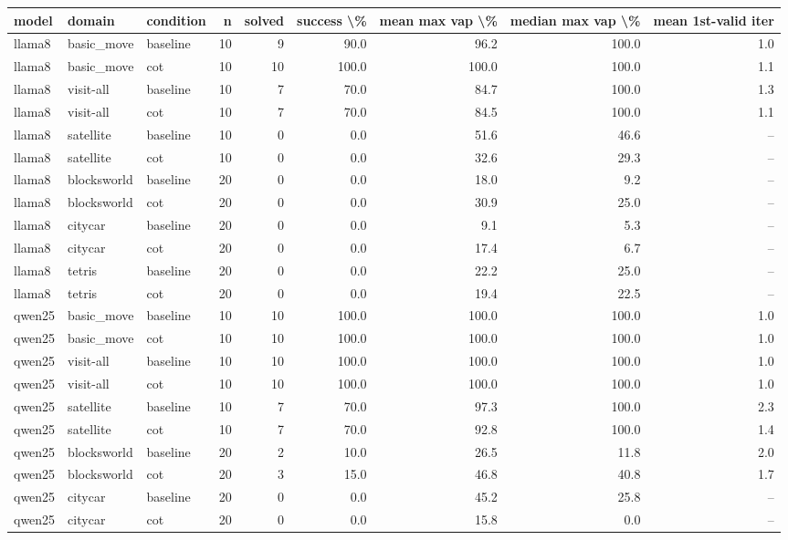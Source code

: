 \begin{tabular}{lllrrrrrr}
\toprule
model & domain & condition & n & solved & success \textbackslash \% & mean max vap \textbackslash \% & median max vap \textbackslash \% & mean 1st-valid iter \\
\midrule
llama8 & basic\_move & baseline & 10 & 9 & 90.0 & 96.2 & 100.0 & 1.0 \\
llama8 & basic\_move & cot & 10 & 10 & 100.0 & 100.0 & 100.0 & 1.1 \\
llama8 & visit-all & baseline & 10 & 7 & 70.0 & 84.7 & 100.0 & 1.3 \\
llama8 & visit-all & cot & 10 & 7 & 70.0 & 84.5 & 100.0 & 1.1 \\
llama8 & satellite & baseline & 10 & 0 & 0.0 & 51.6 & 46.6 & -- \\
llama8 & satellite & cot & 10 & 0 & 0.0 & 32.6 & 29.3 & -- \\
llama8 & blocksworld & baseline & 20 & 0 & 0.0 & 18.0 & 9.2 & -- \\
llama8 & blocksworld & cot & 20 & 0 & 0.0 & 30.9 & 25.0 & -- \\
llama8 & citycar & baseline & 20 & 0 & 0.0 & 9.1 & 5.3 & -- \\
llama8 & citycar & cot & 20 & 0 & 0.0 & 17.4 & 6.7 & -- \\
llama8 & tetris & baseline & 20 & 0 & 0.0 & 22.2 & 25.0 & -- \\
llama8 & tetris & cot & 20 & 0 & 0.0 & 19.4 & 22.5 & -- \\
qwen25 & basic\_move & baseline & 10 & 10 & 100.0 & 100.0 & 100.0 & 1.0 \\
qwen25 & basic\_move & cot & 10 & 10 & 100.0 & 100.0 & 100.0 & 1.0 \\
qwen25 & visit-all & baseline & 10 & 10 & 100.0 & 100.0 & 100.0 & 1.0 \\
qwen25 & visit-all & cot & 10 & 10 & 100.0 & 100.0 & 100.0 & 1.0 \\
qwen25 & satellite & baseline & 10 & 7 & 70.0 & 97.3 & 100.0 & 2.3 \\
qwen25 & satellite & cot & 10 & 7 & 70.0 & 92.8 & 100.0 & 1.4 \\
qwen25 & blocksworld & baseline & 20 & 2 & 10.0 & 26.5 & 11.8 & 2.0 \\
qwen25 & blocksworld & cot & 20 & 3 & 15.0 & 46.8 & 40.8 & 1.7 \\
qwen25 & citycar & baseline & 20 & 0 & 0.0 & 45.2 & 25.8 & -- \\
qwen25 & citycar & cot & 20 & 0 & 0.0 & 15.8 & 0.0 & -- \\

\end{tabular}
